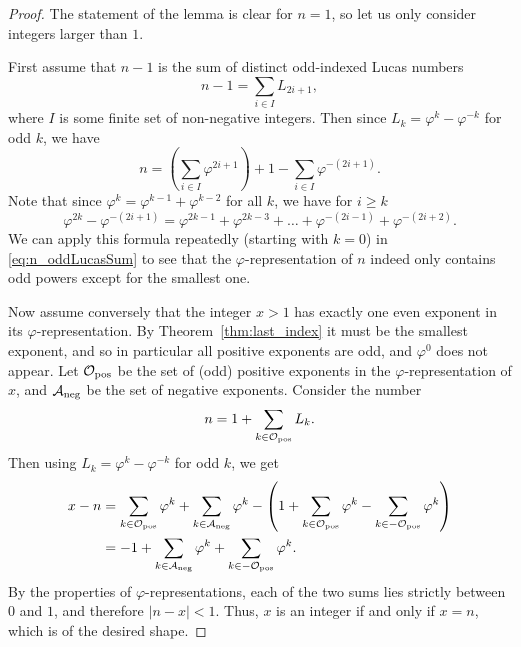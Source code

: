 \documentclass[12pt,reqno]{article}
\begin{document}
\begin{proof}
The statement of the lemma is clear for $n = 1$, so let us only consider integers larger than $1$.

First assume that $n-1$ is the sum of distinct odd-indexed Lucas numbers
\[
    n - 1 = \sum_{i \in I} L_{2i + 1},
\]
where $I$ is some finite set of non-negative integers.
Then since $L_k = \varphi^k - \varphi^{-k}$ for odd $k$, we have 
\begin{equation}\label{eq:n_oddLucasSum}
    n = \left(\sum_{i \in I} \varphi^{2i + 1} \right) 
    + 1 - \sum_{i \in I} \varphi^{-(2i+1)}.
\end{equation}
Note that since $\varphi^{k} = \varphi^{k-1} + \varphi^{k-2}$ for all $k$, we have for $i \geq k$
\[
    \varphi^{2k} - \varphi^{-(2i+1)}
    = \varphi^{2k-1} + \varphi^{2k-3} + \dots +\varphi^{-(2i - 1)} + \varphi^{- (2i+2)}.
\]
We can apply this formula repeatedly (starting with $k=0$) in \eqref{eq:n_oddLucasSum} to see that the $\varphi$-representation of $n$ indeed only contains odd powers except for the smallest one.


Now assume conversely that the integer $x>1$ has exactly one even exponent in its $\varphi$-representation. 
By Theorem~\ref{thm:last_index} it must be the smallest exponent, and so in particular all positive exponents are odd, and $\varphi^0$ does not appear.
Let ${\cal O}_{\text{pos}}$ be the set of (odd) positive exponents in the $\varphi$-representation of $x$, and ${\cal A}_{\text{neg}}$ be the set of negative exponents. Consider the number
\[
    n = 1 + \sum_{k \in {\cal O}_{\text{pos}}} L_k.
\]
Then using $L_k = \varphi^k - \varphi^{-k}$ for odd $k$, we get
\begin{align*}
    x - n
    &= \sum_{k \in {\cal O}_{\text{pos}}} \varphi^{k} 
        + \sum_{k \in {\cal A}_{\text{neg}}} \varphi^{k}
    - \left( 1 + \sum_{k \in {\cal O}_{\text{pos}}} \varphi^k
    - \sum_{k \in -{\cal O}_{\text{pos}}} \varphi^k
    \right)\\
    & = -1 + \sum_{k \in {\cal A}_{\text{neg}}} \varphi^{k}
    + \sum_{k \in - {\cal O}_{ \text{pos}}} \varphi^{k}.
\end{align*}
By the properties of $\varphi$-representations, each of the two sums lies strictly between $0$ and $1$, and therefore $|n-x| < 1$. 
Thus, $x$ is an integer if and only if $x = n$, which is of the desired shape. 
\end{proof}
\end{document}

